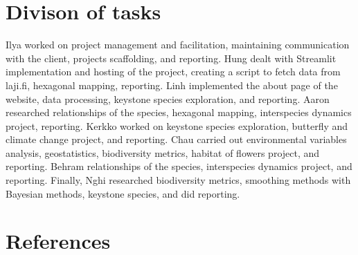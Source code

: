 \documentclass{article}
\begin{document}
\section{Divison of tasks}
Ilya worked on project management and facilitation, maintaining communication with the client, projects  scaffolding, and reporting. Hung dealt with Streamlit implementation and hosting of the project, creating a script to fetch data from laji.fi, hexagonal mapping, reporting. Linh implemented the about page of the website, data processing, keystone species exploration, and reporting. Aaron researched relationships of the species, hexagonal mapping, interspecies dynamics project, reporting. Kerkko worked on keystone species exploration, butterfly and climate change project, and reporting. Chau carried out environmental variables analysis, geostatistics, biodiversity metrics, habitat of flowers project, and reporting. Behram relationships of the species, interspecies dynamics project, and reporting. Finally, Nghi researched biodiversity metrics, smoothing methods with Bayesian methods, keystone species, and did reporting.
\newpage
\section{References}
\renewcommand{\section}[2]{} %
\end{document}

